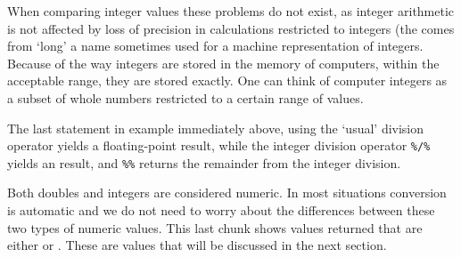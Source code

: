 \documentclass[paper=a4,10pt,div=17,headsepline,BCOR=12mm,twoside,open=right]{scrbook}\usepackage{knitr}
\begin{document}
When comparing integer values these problems do not exist, as integer arithmetic is not affected by loss of precision in calculations restricted to integers (the  comes from `long' a name sometimes used for a machine representation of integers. Because of the way integers are stored in the memory of computers, within the acceptable range, they are stored exactly. One can think of computer integers as a subset of whole numbers restricted to a certain range of values.

\begin{knitrout}\footnotesize
{}\color{fgcolor}
\end{knitrout}

The last statement in example immediately above, using the `usual' division operator yields a floating-point  result, while the integer division operator \verb|%/%| yields an  result, and \verb|%%| returns the remainder from the integer division. 

Both doubles and integers are considered numeric. In most situations conversion is automatic and we do not need to worry about the differences between these two types of numeric values. This last chunk shows values returned that are either  or . These are  values that will be discussed in the next section.
\end{document}
